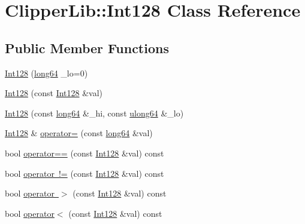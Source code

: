 \hypertarget{class_clipper_lib_1_1_int128}{}\section{Clipper\+Lib\+::Int128 Class Reference}
\label{class_clipper_lib_1_1_int128}
\subsection*{Public Member Functions}
\begin{DoxyCompactItemize}
\item 
\mbox{\hyperlink{class_clipper_lib_1_1_int128_acb7953a56e0ddb6d3245268e457f9e37}{Int128}} (\mbox{\hyperlink{namespace_clipper_lib_a7fd564bf34d174b6c96e07d01e5e7a0a}{long64}} \+\_\+lo=0)
\item 
\mbox{\hyperlink{class_clipper_lib_1_1_int128_ad113c3dc3bd371984b05fddb1fe527e2}{Int128}} (const \mbox{\hyperlink{class_clipper_lib_1_1_int128}{Int128}} \&val)
\item 
\mbox{\hyperlink{class_clipper_lib_1_1_int128_ac23a17a6a5ea143f0297b7ba0dd1830e}{Int128}} (const \mbox{\hyperlink{namespace_clipper_lib_a7fd564bf34d174b6c96e07d01e5e7a0a}{long64}} \&\+\_\+hi, const \mbox{\hyperlink{namespace_clipper_lib_a031fec5e97eb7e08708f1cafa53a232d}{ulong64}} \&\+\_\+lo)
\item 
\mbox{\hyperlink{class_clipper_lib_1_1_int128}{Int128}} \& \mbox{\hyperlink{class_clipper_lib_1_1_int128_a908b1ffab7e190f8db9d2adccbb9eef4}{operator=}} (const \mbox{\hyperlink{namespace_clipper_lib_a7fd564bf34d174b6c96e07d01e5e7a0a}{long64}} \&val)
\item 
bool \mbox{\hyperlink{class_clipper_lib_1_1_int128_a8946a96471d06371fd5ea4f4f65cb4c9}{operator==}} (const \mbox{\hyperlink{class_clipper_lib_1_1_int128}{Int128}} \&val) const
\item 
bool \mbox{\hyperlink{class_clipper_lib_1_1_int128_a2299394b0fe19c77fe9f14fc8683a0a6}{operator !=}} (const \mbox{\hyperlink{class_clipper_lib_1_1_int128}{Int128}} \&val) const
\item 
bool \mbox{\hyperlink{class_clipper_lib_1_1_int128_a851e15de15e68fb7db0f08431b8e3e48}{operator $>$}} (const \mbox{\hyperlink{class_clipper_lib_1_1_int128}{Int128}} \&val) const
\item 
bool \mbox{\hyperlink{class_clipper_lib_1_1_int128_ab55bb6a363e7ced8e5e64a1eefac6000}{operator$<$}} (const \mbox{\hyperlink{class_clipper_lib_1_1_int128}{Int128}} \&val) const
\item 

\end{DoxyCompactItemize}
